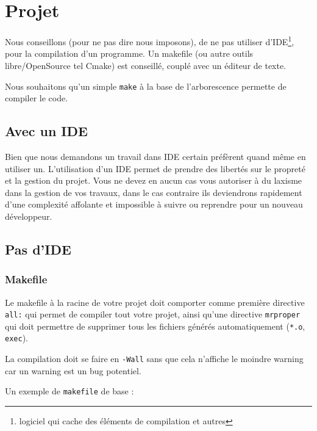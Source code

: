 \section{Projet}
	Nous conseillons (pour ne pas dire nous imposons), de ne pas utiliser d'IDE\footnote{logiciel qui cache des éléments de compilation et autres}, pour la compilation d'un programme. Un makefile (ou autre outils libre/OpenSource tel Cmake) est conseillé, couplé avec un éditeur de texte.

	Nous souhaitons qu'un simple \verb+make+ à la base de l'arborescence permette de compiler le code.

	\subsection{Avec un IDE}
		Bien que nous demandons un travail dans IDE certain préfèrent quand même en utiliser un. L'utilisation d'un IDE permet de prendre des libertés sur le propreté et la gestion du projet. Vous ne devez en aucun cas vous autoriser à du laxisme dans la gestion de vos travaux, dans le cas contraire ils deviendrons rapidement d'une complexité affolante et impossible à suivre ou reprendre pour un nouveau développeur.

	\subsection{Pas d'IDE}
		\subsubsection{Makefile}
			Le makefile à la racine de votre projet doit comporter comme première directive \verb+all:+ qui permet de compiler tout votre projet, ainsi qu'une directive \verb+mrproper+ qui doit permettre de supprimer tous les fichiers générés automatiquement (\verb+*.o+, \verb+exec+).

			La compilation doit se faire en \verb+-Wall+ sans que cela n’affiche le moindre warning car un warning est un bug potentiel.

			Un exemple de \verb+makefile+ de base :

